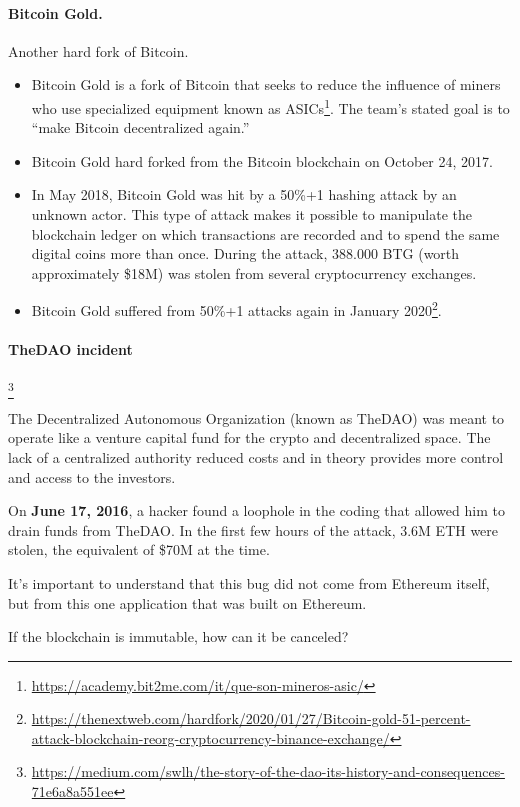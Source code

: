 \paragraph*{Bitcoin Gold.}
Another hard fork of Bitcoin.
\begin{itemize}
    \item Bitcoin Gold is a fork of Bitcoin that seeks to reduce the influence of miners who use specialized equipment known as ASICs\footnote{\url{https://academy.bit2me.com/it/que-son-mineros-asic/}}. The team's stated goal is to ``make Bitcoin decentralized again.''
    \item Bitcoin Gold hard forked from the Bitcoin blockchain on October 24, 2017.
    \item In May 2018, Bitcoin Gold was hit by a 50\%+1 hashing attack by an unknown actor. This type of attack makes it possible to manipulate the blockchain ledger on which transactions are recorded and to spend the same digital coins more than once. During the attack, 388.000 BTG (worth approximately \$18M) was stolen from several cryptocurrency exchanges.
    \item Bitcoin Gold suffered from 50\%+1 attacks again in January 2020\footnote{{\scriptsize\url{https://thenextweb.com/hardfork/2020/01/27/Bitcoin-gold-51-percent-attack-blockchain-reorg-cryptocurrency-binance-exchange/}}}.
\end{itemize}

\paragraph{TheDAO incident}\label{dao-incident}\footnote{\url{https://medium.com/swlh/the-story-of-the-dao-its-history-and-consequences-71e6a8a551ee}}

The Decentralized Autonomous Organization (known as TheDAO) was meant to operate like a venture capital fund for the crypto and decentralized space. The lack of a centralized authority reduced costs and in theory provides more control and access to the investors.

On \textbf{June 17, 2016}, a hacker found a loophole in the coding that allowed him to drain funds from TheDAO. In the first few hours of the attack, 3.6M ETH were stolen, the equivalent of \$70M at the time.

It's important to understand that this bug did not come from Ethereum itself, but from this one application that was built on Ethereum.

If the blockchain is immutable, how can it be canceled?

